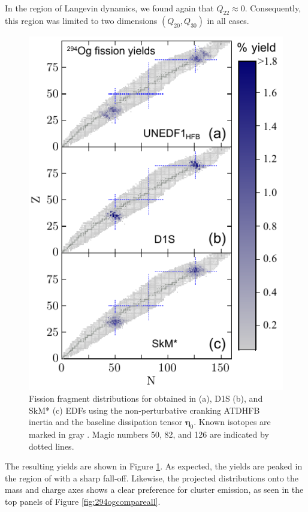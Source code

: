 In the region of Langevin dynamics, we found again that $Q_{22} \approx 0$. Consequently, this region was limited to two dimensions $(Q_{20}, Q_{30})$ in all cases.

\begin{figure}
	\centering
	\includegraphics[width=0.9\linewidth]{TeX_files/294Og_3yields}
	\caption[N-Z fission fragment yields from $^{294}$Og]{Fission fragment distributions for \Og{} obtained in \hfb{} (a), D1S (b), and SkM* (c) EDFs using the non-perturbative cranking ATDHFB inertia and  the baseline  dissipation tensor $\mathbf{\eta}_0$. Known isotopes are marked in gray \cite{NuDat}. Magic numbers 50, 82, and 126 are indicated by dotted lines.}
	\label{fig:294og3yields}
\end{figure}

The resulting yields are shown in Figure \ref{fig:294og3yields}. As expected, the yields are peaked in the region of {\Pb} with a sharp fall-off. Likewise, the projected distributions onto the mass and charge axes shows a clear preference for cluster emission, as seen in the top panels of Figure \ref{fig:294ogcompareall}.

